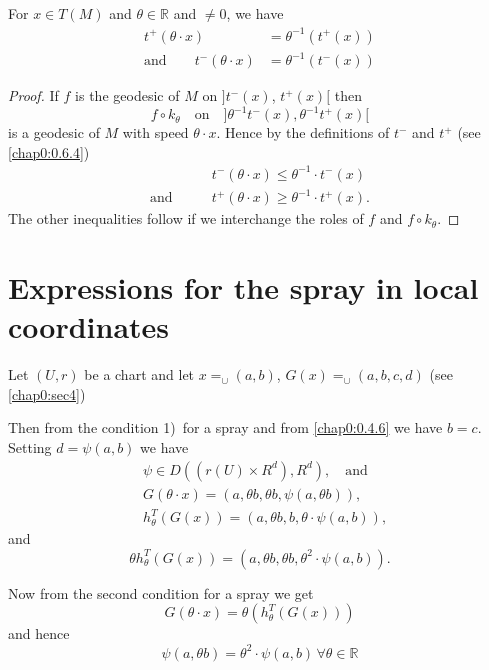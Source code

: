 \subsection{}\label{chap1:1.2.8}

\begin{coro*}
For $x\in T(M)$ and $\theta\in\mathbb{R}$ and $\neq 0$, we have
\begin{align*}
t^{+}(\theta\cdot x) &= \theta^{-1}(t^{+}(x))\\
\text{and}\qquad t^{-}(\theta\cdot x) &= \theta^{-1}(t^{-}(x))
\end{align*}
\end{coro*}

\begin{proof}
If $f$ is the geodesic of $M$ on $]t^{-}(x)$, $t^{+}(x)[$ then
$$
f\circ k_{\theta}\quad\text{on}\quad ]\theta^{-1}t^{-}(x), \theta^{-1}t^{+}(x)[
$$
is a geodesic of $M$ with speed $\theta\cdot x$. Hence by the
definitions of $t^{-}$ and $t^{+}$ (see \ref{chap0:0.6.4})
\begin{align*}
& t^{-}(\theta\cdot x)\leq \theta^{-1}\cdot t^{-}(x)\\
\text{and}\qquad & t^{+}(\theta\cdot x)\geq \theta^{-1}\cdot t^{+}(x).
\end{align*}
The other inequalities follow if we interchange the roles of $f$ and
$f\circ k_{\theta}$.
\end{proof}

\section{Expressions for the spray in local coordinates}\label{chap1:sec3}

Let $(U,r)$ be a chart and let
$x{\displaystyle{\mathop{=}_{\cup}}}(a,b)$,
$G(x){\displaystyle{\mathop{=}_{\cup}}}(a,b,c,d)$ (see \ref{chap0:sec4})

Then from the condition 1)~for a spray and from \eqref{chap0:0.4.6} we have
$b=c$. Setting $d=\psi(a,b)$ we have
\begin{align*}
& \psi\in D((r(U)\times R^{d}),R^{d}),\quad\text{and}\\
& G(\theta\cdot x)=(a,\theta b,\theta b,\psi(a,\theta b)),\\
& h^{T}_{\theta}(G(x))=(a,\theta b,b,\theta\cdot\psi(a,b)),
\end{align*}
and\pageoriginale
$$
\theta h^{T}_{\theta}(G(x))=(a,\theta b,\theta b,\theta^{2}\cdot \psi(a,b)).
$$

Now from the second condition for a spray we get
$$
G(\theta\cdot x)=\theta(h^{T}_{\theta}(G(x)))
$$
and hence
\begin{equation*}
\psi(a, \theta b)=\theta^{2}\cdot \psi(a,b)\,\forall \theta\in
\mathbb{R}\tag{1.3.1}\label{chap1:1.3.1}
\end{equation*}

